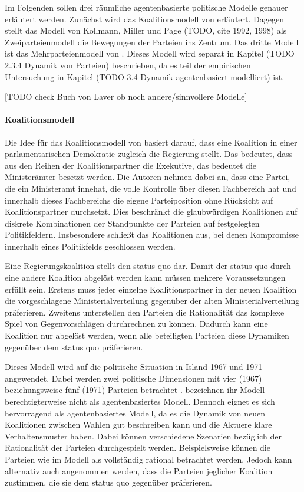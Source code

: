 Im Folgenden sollen drei räumliche agentenbasierte politische Modelle genauer erläutert werden. Zunächst wird das Koalitionsmodell von \citet{laver1990coalitions} erläutert. Dagegen stellt das Modell von Kollmann, Miller und Page (TODO, cite 1992, 1998) als Zweiparteienmodell die Bewegungen der Parteien ins Zentrum. Das dritte Modell ist das Mehrparteienmodell von \citet{laver2005policy}. Dieses Modell wird separat in Kapitel (TODO 2.3.4 Dynamik von Parteien) beschrieben, da es teil der empirischen Untersuchung in Kapitel (TODO 3.4 Dynamik agentenbasiert modelliert) ist.

[TODO check Buch von Laver ob noch andere/sinnvollere Modelle]

\paragraph{Koalitionsmodell}
Die Idee für das Koalitionsmodell von \citet{laver1990coalitions} basiert darauf, dass eine Koalition in einer parlamentarischen Demokratie zugleich die Regierung stellt. Das bedeutet, dass aus den Reihen der Koalitionspartner die Exekutive, das bedeutet die Ministerämter besetzt werden. Die Autoren nehmen dabei an, dass eine Partei, die ein Ministeramt innehat, die volle Kontrolle über diesen Fachbereich hat und innerhalb dieses Fachbereichs die eigene Parteiposition ohne Rücksicht auf Koalitionspartner durchsetzt. Dies beschränkt die glaubwürdigen Koalitionen auf diskrete Kombinationen der Standpunkte der Parteien auf festgelegten Politikfeldern. Insbesondere schließt das Koalitionen aus, bei denen Kompromisse innerhalb eines Politikfelds geschlossen werden. \citep[S.\,873-5]{laver1990coalitions}

Eine Regierungskoalition stellt den status quo dar. Damit der status quo durch eine andere Koalition abgelöst werden kann müssen mehrere Voraussetzungen erfüllt sein. Erstens muss jeder einzelne Koalitionspartner in der neuen Koalition die vorgeschlagene Ministerialverteilung gegenüber der alten Ministerialverteilung präferieren. Zweitens unterstellen \citet{laver1990coalitions} den Parteien die Rationalität das komplexe Spiel von Gegenvorschlägen durchrechnen zu können. Dadurch kann eine Koalition nur abgelöst werden, wenn alle beteiligten Parteien diese Dynamiken gegenüber dem status quo präferieren. \citep[S.\,877-8]{laver1990coalitions}

Dieses Modell wird auf die politische Situation in Island 1967 und 1971 angewendet. Dabei werden zwei politische Dimensionen mit vier (1967) beziehungsweise fünf (1971) Parteien betrachtet \citep[S.\,882-5]{laver1990coalitions}. \citet{laver1990coalitions} bezeichnen ihr Modell berechtigterweise nicht als agentenbasiertes Modell. Dennoch eignet es sich hervorragend als agentenbasiertes Modell, da es die Dynamik von neuen Koalitionen zwischen Wahlen gut beschreiben kann und die Aktuere klare Verhaltensmuster haben. Dabei können verschiedene Szenarien bezüglich der Rationalität der Parteien durchgespielt werden. Beispielsweise können die Parteien wie im Modell als vollständig rational betrachtet werden. Jedoch kann alternativ auch angenommen werden, dass die Parteien jeglicher Koalition zustimmen, die sie dem status quo gegenüber präferieren.

